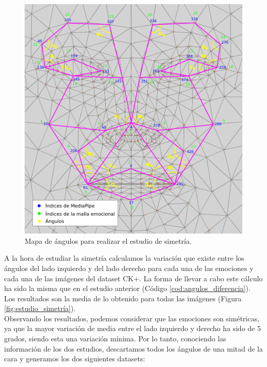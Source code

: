 \begin{figure} [h!]
  \begin{center}
    \includegraphics[width=13cm]{figs/emotional_mesh_2_mitades.png}
  \end{center}
  \captionsetup{justification=centering}
  \caption{Mapa de ángulos para realizar el estudio de simetría.}
  \label{fig:emotional_mesh_2_mitades}
\end{figure}

A la hora de estudiar la simetría calculamos la variación que existe entre los ángulos del lado izquierdo y del lado derecho para cada una de las emociones y cada una de las imágenes del dataset CK+. La forma de llevar a cabo este cálculo ha sido la misma que en el estudio anterior (Código \ref{cod:angulos_diferencia}). Los resultados son la media de lo obtenido para todas las imágenes (Figura \ref{fig:estudio_simetría}).\\

Observando los resultados, podemos considerar que las emociones son simétricas, ya que la mayor variación de media entre el lado izquierdo y derecho ha sido de 5 grados, siendo esta una variación mínima. Por lo tanto, conociendo las información de los dos estudios, descartamos todos los ángulos de una mitad de la cara y generamos los dos siguientes datasets:

